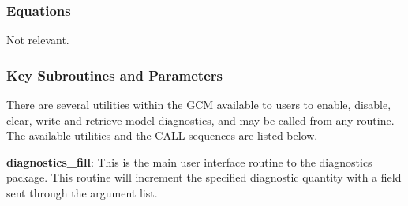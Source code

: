 \subsubsection{Equations}
Not relevant.

\subsubsection{Key Subroutines and Parameters}
\label{sec:diagnostics:diagover}

\noindent
There are several utilities within the GCM available to users to enable, disable,
clear, write and retrieve model diagnostics, and may be called from any routine.  
The available utilities and the CALL sequences are listed below.

\noindent
{\bf diagnostics\_fill}:  This is the main user interface routine to the diagnostics
package. This routine will increment the specified diagnostic quantity with a field 
sent through the argument list.

